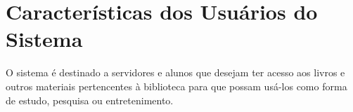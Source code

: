 \chapter{Características dos Usuários do Sistema}

O sistema é destinado a servidores e alunos que desejam ter acesso aos livros e outros materiais pertencentes à biblioteca para que possam usá-los como forma de estudo, pesquisa ou entretenimento. 